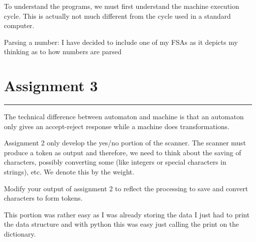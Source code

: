 \documentclass[letterpaper,10pt]{article}
\begin{document}
To understand the programs, we must first understand the machine execution cycle. This is actually not much different from the cycle used in a standard computer.

\begin{mdframed}[style=MyFrame]
Parsing a number: I have decided to include one of my FSAs as it depicts my thinking as to how numbers are parsed \\
\end{mdframed}
\section{Assignment 3} \hrule
The technical difference between automaton and machine is that an automaton only gives an accept-reject response while a machine does transformations.

Assignment 2 only develop the yes/no portion of the scanner. The scanner must produce a token as output and therefore, we need to think about the saving of characters, possibly converting some (like integers or special characters in strings), etc. We denote this by the weight.

Modify your output of assignment 2 to reflect the processing to save and convert characters to form tokens.
\begin{mdframed}[style=MyFrame]
This portion was rather easy as I was already storing the data I just had to print the data structure and with python this was easy just calling the print on the dictionary. 
\end{mdframed}
\end{document}
